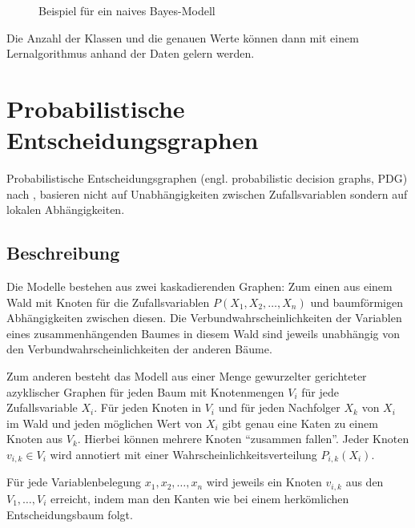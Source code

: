 \documentclass{llncs}
\begin{document}
\begin{figure}[htb]
\caption{\label{fig:nbgraph}Beispiel für ein naives Bayes-Modell}
\centering
{}
\end{figure}

Die Anzahl der Klassen und die genauen Werte können dann mit einem Lernalgorithmus anhand der Daten gelern werden. 

\section{Probabilistische Entscheidungsgraphen}

Probabilistische Entscheidungsgraphen (engl. probabilistic decision graphs, PDG) nach \cite{bozga1999representation}, \cite{jaeger2004probabilistic} basieren nicht auf Unabhängigkeiten zwischen Zufallsvariablen sondern auf lokalen Abhängigkeiten. 

\subsection{Beschreibung}

Die Modelle bestehen aus zwei kaskadierenden Graphen: Zum einen aus einem Wald mit Knoten für die Zufallsvariablen $P(X_1,X_2,\dots,X_n)$ und baumförmigen Abhängigkeiten zwischen diesen. Die Verbundwahrscheinlichkeiten der Variablen eines zusammenhängenden Baumes in diesem Wald sind jeweils unabhängig von den Verbundwahrscheinlichkeiten der anderen Bäume. 

Zum anderen besteht das Modell aus einer Menge gewurzelter gerichteter azyklischer Graphen für jeden Baum mit Knotenmengen $V_i$ für jede Zufallsvariable $X_i$. Für jeden Knoten in $V_i$  und für jeden Nachfolger $X_k$ von $X_i$ im Wald und jeden möglichen Wert von $X_i$ gibt genau eine Katen zu einem Knoten aus $V_k$. Hierbei können mehrere Knoten ``zusammen fallen''. Jeder Knoten $v_{i,k} \in V_i$ wird annotiert mit einer Wahrscheinlichkeitsverteilung $P_{i,k}(X_i)$. 

Für jede Variablenbelegung $x_1, x_2, \dots, x_n$ wird jeweils ein Knoten $v_{i,k}$ aus den $V_1, \dots, V_i$ erreicht, indem man den Kanten wie bei einem herkömlichen Entscheidungsbaum folgt. 
\end{document}
